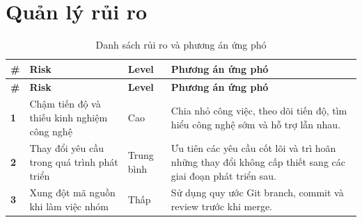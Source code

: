 \section{Quản lý rủi ro}

\begin{longtable}{|L{1cm}|L{5cm}|L{2cm}|L{6cm}|}

\caption{Danh sách rủi ro và phương án ứng phó}
\label{tab:rui-ro}
\\

\hline
\textbf{\#} &
\textbf{Risk} &
\textbf{Level} &
\textbf{Phương án ứng phó} \\
\hline

\endfirsthead

\hline
\textbf{\#} &
\textbf{Risk} &
\textbf{Level} &
\textbf{Phương án ứng phó} \\
\hline

\endhead

\hline
\endfoot

\textbf{1}
& Chậm tiến độ và thiếu kinh nghiệm công nghệ
& Cao
& Chia nhỏ công việc, theo dõi tiến độ, tìm hiểu công nghệ sớm và hỗ trợ lẫn nhau. \\
\hline

\textbf{2}
& Thay đổi yêu cầu trong quá trình phát triển
& Trung bình
& Ưu tiên các yêu cầu cốt lõi và trì hoãn những thay đổi không cấp thiết sang các giai đoạn phát triển sau. \\
\hline

\textbf{3}
& Xung đột mã nguồn khi làm việc nhóm
& Thấp
& Sử dụng quy ước Git branch, commit và review trước khi merge. \\
\hline

\end{longtable}